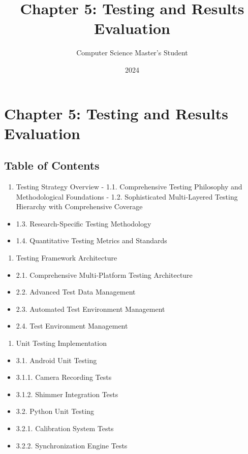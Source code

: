 \documentclass[12pt,a4paper]{article}
\title{Chapter 5: Testing and Results Evaluation}
\author{Computer Science Master's Student}
\date{2024}
\begin{document}
\maketitle

\section{Chapter 5: Testing and Results Evaluation}

\subsection{Table of Contents}

\begin{enumerate}
\item Testing Strategy Overview
    -
    1.1. Comprehensive Testing Philosophy and Methodological Foundations
    -
    1.2. Sophisticated Multi-Layered Testing Hierarchy with Comprehensive Coverage
\end{enumerate}
\begin{itemize}
\item 1.3. Research-Specific Testing Methodology
\item 1.4. Quantitative Testing Metrics and Standards
\end{itemize}
\begin{enumerate}
\item Testing Framework Architecture
\end{enumerate}
\begin{itemize}
\item 2.1. Comprehensive Multi-Platform Testing Architecture
\item 2.2. Advanced Test Data Management
\item 2.3. Automated Test Environment Management
\item 2.4. Test Environment Management
\end{itemize}
\begin{enumerate}
\item Unit Testing Implementation
\end{enumerate}
\begin{itemize}
\item 3.1. Android Unit Testing
\item 3.1.1. Camera Recording Tests
\item 3.1.2. Shimmer Integration Tests
\item 3.2. Python Unit Testing
\item 3.2.1. Calibration System Tests
\item 3.2.2. Synchronization Engine Tests
\end{itemize}
\end{document}
